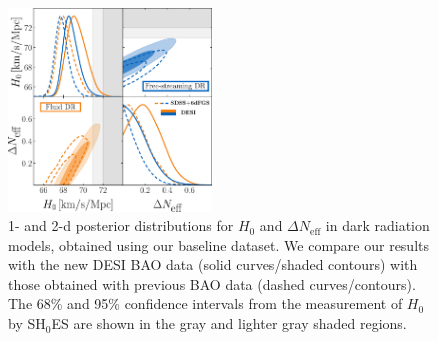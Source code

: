 \documentclass[aps,prd,twocolumn,notitlepage,
superscriptaddress,
nofootinbib,floatfix]{revtex4-2}
\newcommand{\DNeff}{\Delta N_\text{eff}}
\begin{document}
\begin{figure}
    \includegraphics[width=0.48\textwidth]{figures_21_4/main_constraints_2.pdf}
    \caption{1- and 2-d posterior distributions for $H_0$ and $\DNeff$ in dark radiation models, obtained using our baseline dataset. We compare our results with the new DESI BAO data (solid curves/shaded contours) with those obtained with previous BAO data (dashed curves/contours). The 68\% and 95\% confidence intervals from the measurement of $H_0$ by SH$_0$ES are shown in the gray and lighter gray shaded regions.}
    \label{fig:bossvdesi}
\end{figure}
\end{document}
